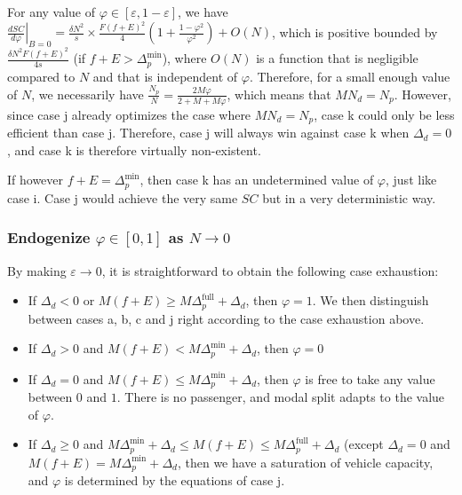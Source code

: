 \documentclass[english, a4paper]{article}
\theoremstyle{plain}
\theoremstyle{definition}
\theoremstyle{remark}
\begin{document}
    For any value of $\varphi \in [\varepsilon, 1 - \varepsilon]$, we have $\left. \frac{dSC}{d\varphi}\right|_{B = 0} = \frac{\delta N^2}{s}\times \frac{F(f+ E)^2}{4} \left( 1 + \frac{1 - \varphi^2}{\varphi^2}\right) + O(N)$, which is positive bounded by $\frac{\delta N^2 F(f+E)^2}{4s}$ (if $f + E > \Delta_p^{\text{min}}$), where $O(N)$ is a function that is negligible compared to $N$ and that is independent of $\varphi$. Therefore, for a small enough value of $N$, we necessarily have $\frac{N_p}{N} = \frac{2M\varphi}{2 + M + M\varphi}$, which means that $MN_d = N_p$. However, since case j already optimizes the case where $MN_d = N_p$, case k could only be less efficient than case j. Therefore, case j will always win against case k when $\Delta_d = 0$, and case k is therefore virtually non-existent.

    If however $f + E = \Delta_p^{\text{min}}$, then case k has an undetermined value of $\varphi$, just like case i. Case j would achieve the very same $SC$ but in a very deterministic way.

    \subsubsection{Endogenize $\varphi \in [0, 1]$ as $N \rightarrow 0$}

    By making $\varepsilon \rightarrow 0$, it is straightforward to obtain the following case exhaustion:

    \begin{itemize}%
        \item If $\Delta_d < 0$ or $M(f + E) \geq M\Delta_p^{\text{full}} + \Delta_d$, then $\varphi = 1$. We then distinguish between cases a, b, c and j right according to the case exhaustion above.
        \item If $\Delta_d > 0$ and $M(f + E) < M\Delta_p^{\text{min}} + \Delta_d$, then $\varphi = 0$
        \item If $\Delta_d = 0$ and $M(f + E) \leq M\Delta_p^{\text{min}} + \Delta_d$, then $\varphi$ is free to take any value between $0$ and $1$. There is no passenger, and modal split adapts to the value of $\varphi$.
        \item If $\Delta_d \geq 0$ and $M\Delta_p^{\text{min}} + \Delta_d \leq M(f + E) \leq M\Delta_p^{\text{full}} + \Delta_d$ (except $\Delta_d = 0$ and $M(f + E) = M\Delta_p^{\text{min}} + \Delta_d$, then we have a saturation of vehicle capacity, and $\varphi$ is determined by the equations of case j.

        \end{itemize}
\end{document}
